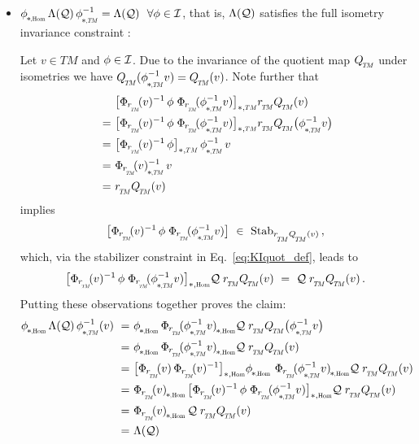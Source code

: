 \begin{itemize}[leftmargin=0cm]
\begin{itemize}[leftmargin=1.1cm]
        \item[\it 2\hspace{1pt}c)]
            $\dphiHom \Lambda(\Q)\, \dphiTMinv = \Lambda(\Q)\ \ \forall \phi \in \I$,
            that is, $\Lambda(\mathcal{Q})$ satisfies the full isometry invariance constraint :

            Let $v\in TM$ and $\phi \in \mathcal{I}$.
            Due to the invariance of the quotient map $\QTM$ under isometries we have $\QTM(\dphiTMinv v) = \QTM(v)$.
            Note further that
            \begin{align}
                & \big[\Phir{v}^{-1}\, \phi\; \Phir{\dphiTMinv v}\big]_{*,\scalebox{.58}{$TM$}} \rTM \QTM(v) \notag \\
                \ =\ & \big[\Phir{v}^{-1}\, \phi\; \Phir{\dphiTMinv v}\big]_{*,\scalebox{.58}{$TM$}} \rTM \QTM\big( \dphiTMinv v\big) \notag \\
                \ =\ & \big[\Phir{v}^{-1}\, \phi \big]_{*,\scalebox{.58}{$TM$}}\, \dphiTMinv\, v \notag \\
                \ =\ & \dPhirTM{v}^{-1}\, v \notag \\
                \ =\ & \rTM \QTM(v)
            \end{align}
            implies
            \begin{align}
                \big[\Phir{v}^{-1}\, \phi\; \Phir{\dphiTMinv v}\big]\ \in\ \Stab{\rTM\QTM(v)} \,,
            \end{align}
            which, via the stabilizer constraint in Eq.~\eqref{eq:KIquot_def}, leads to
            \begin{align}
                \big[\Phir{v}^{-1}\, \phi\; \Phir{\dphiTMinv v}\big]_{*,\scalebox{.58}{$\Hom$}} \Q\; \rTM \QTM(v)
                \ =\ \Q\; \rTM \QTM(v) \,.
            \end{align}
            Putting these observations together proves the claim:
            \begin{align}
                \dphiHom \Lambda(\Q)\, \dphiTMinv(v)
                \ =&\ \dphiHom \dPhirHom{\dphiTMinv v} \Q\; \rTM \QTM \big(\dphiTMinv v\big) \notag \\
                \ =&\ \dphiHom \dPhirHom{\dphiTMinv v} \Q\; \rTM \QTM(v) \notag \\
                \ =&\ \big[\Phir{v}\, \Phir{v}^{-1}\big]_{*,\scalebox{.58}{$\Hom$}} \dphiHom\, \dPhirHom{\dphiTMinv v} \Q\; \rTM \QTM(v) \notag \\
                \ =&\ \dPhirHom{v}\, \big[\Phir{v}^{-1}\, \phi\; \Phir{\dphiTMinv v}\big]_{*,\scalebox{.58}{$\Hom$}} \Q\; \rTM \QTM(v) \notag \\
                \ =&\ \dPhirHom{v}\, \Q\; \rTM \QTM(v) \notag \\
                \ =&\ \Lambda(\Q)
            \end{align}



\end{itemize}
\end{itemize}
